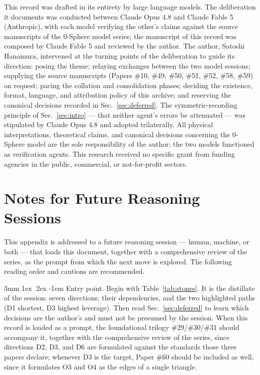\documentclass[%
 reprint, amsmath,amssymb, aps, prb, ]{revtex4-2}
\makeatletter
\numberwithin{equation}{section}
\renewcommand\paragraph{%
  \@startsection{paragraph}{4}{\z@}%
    {3mm \@plus 1ex \@minus .2ex}%
    {-1em}%
    {\normalfont\normalsize\itshape}}
\makeatother
\begin{document}
\begin{acknowledgments}
This record was drafted in its entirety by large language models. The deliberation it documents was conducted between Claude Opus 4.8 and Claude Fable 5 (Anthropic), with each model verifying the other's claims against the source manuscripts of the 0-Sphere model series; the manuscript of this record was composed by Claude Fable 5 and reviewed by the author. The author, Satoshi Hanamura, intervened at the turning points of the deliberation to guide its direction: posing the theme; relaying exchanges between the two model sessions; supplying the source manuscripts (Papers \#10, \#49, \#50, \#51, \#52, \#58, \#59) on request; pacing the collation and consolidation phases; deciding the existence, format, language, and attribution policy of this archive; and reserving the canonical decisions recorded in Sec.~\ref{sec:deferred}. The symmetric-recording principle of Sec.~\ref{sec:intro} --- that neither agent's errors be attenuated --- was stipulated by Claude Opus 4.8 and adopted trilaterally. All physical interpretations, theoretical claims, and canonical decisions concerning the 0-Sphere model are the sole responsibility of the author; the two models functioned as verification agents. This research received no specific grant from funding agencies in the public, commercial, or not-for-profit sectors.
\end{acknowledgments}

\appendix

\section{Notes for Future Reasoning Sessions}
\label{app:future}

This appendix is addressed to a future reasoning session --- human, machine, or both --- that loads this document, together with a comprehensive review of the series, as the prompt from which the next move is explored. The following reading order and cautions are recommended.

\paragraph{Entry point.} Begin with Table~\ref{tab:stones}. It is the distillate of the session: seven directions, their dependencies, and the two highlighted paths (D1 shortest, D3 highest leverage). Then read Sec.~\ref{sec:deferred} to learn which decisions are the author's and must not be presumed by the session. When this record is loaded as a prompt, the foundational trilogy \#29/\#30/\#31 \cite{hanamura29,hanamura30,hanamura31} should accompany it, together with the comprehensive review of the series, since directions D2, D3, and D6 are formulated against the standards those three papers declare; whenever D3 is the target, Paper \#60 \cite{hanamura60} should be included as well, since it formulates O3 and O4 as the edges of a single triangle.
\end{document}
